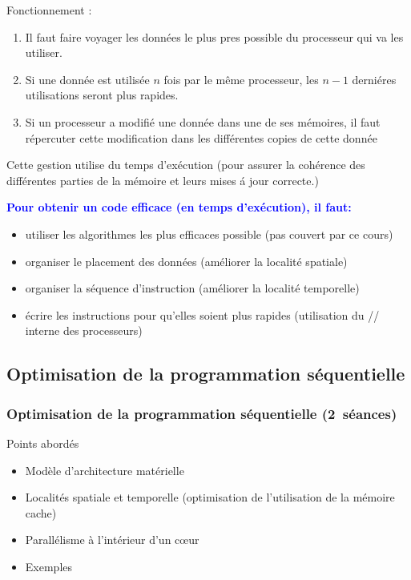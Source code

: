 \documentclass{beamer}
\begin{document}
\begin{frame}[fragile]
Fonctionnement :
\begin{enumerate}
	\item Il faut faire voyager les donn\'ees le plus pres possible du processeur qui va les utiliser. 
	\vfill
	
	\item Si une donn\'ee est utilis\'ee $n$ fois par le m\^eme processeur, les $n-1$ derni\'eres utilisations seront plus rapides.
	\vfill
	
	\item Si un processeur a modifi\'e une donn\'ee dans une de ses m\'emoires, il faut r\'epercuter cette modification dans les diff\'erentes copies de cette donn\'ee
	\vfill
\end{enumerate}

Cette gestion utilise du temps d'ex\'ecution (pour assurer la coh\'erence des diff\'erentes parties de la m\'emoire et leurs mises \'a jour correcte.)


\end{frame}

\begin{frame}[fragile]

\bf
\textcolor{blue}{Pour obtenir un code efficace (en temps d'ex\'ecution), il faut:}

\begin{itemize}
	\item utiliser les algorithmes les plus efficaces possible (pas couvert par ce cours)
	
	\item organiser le placement des donn\'ees (am\'eliorer la localit\'e spatiale)
	
	\item organiser la s\'equence d'instruction (am\'eliorer la localit\'e temporelle)

	\item \'ecrire les instructions pour qu'elles soient plus rapides (utilisation du // interne des processeurs)
\end{itemize}
\end{frame}

\begin{frame}
\section{Optimisation de la programmation séquentielle}
\frametitle{Optimisation de la programmation séquentielle \hbox{(2 séances)}}
Points abordés
\begin{itemize}
\item Modèle d'architecture matérielle
\item Localités spatiale et temporelle (optimisation de l'utilisation de la mémoire cache)
\item Parallélisme à l'intérieur d'un c\oe ur
\item Exemples
\end{itemize}
\end{frame}
\end{document}
